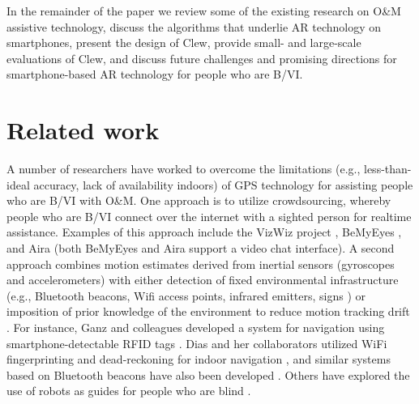 \documentclass[chi_draft]{sigchi}
\newcommand{\BVI}{B/VI\xspace}
\newcommand{\OM}{O\&M\xspace}
\begin{document}
In the remainder of the paper we review some of the existing research on \OM assistive technology, discuss the algorithms that underlie AR technology on smartphones, present the design of Clew, provide small- and large-scale evaluations of Clew, and discuss future challenges and promising directions for smartphone-based AR technology for people who are \BVI.

\section{Related work}


A number of researchers have worked to overcome the limitations (e.g., less-than-ideal accuracy, lack of availability indoors) of GPS technology for assisting people who are \BVI with \OM.  One approach is to utilize crowdsourcing, whereby people who are \BVI connect over the internet with a sighted person for realtime assistance.  Examples of this approach include the VizWiz project \cite{bigham2010vizwiz}, BeMyEyes \cite{bemyeyesaccessworld}, and Aira \cite{aira} (both BeMyEyes and Aira support a video chat interface).  A second approach combines motion estimates derived from inertial sensors (gyroscopes and accelerometers) with either detection of fixed environmental infrastructure (e.g., Bluetooth beacons, Wifi access points, infrared emitters, signs \cite{legge2013indoor}) or imposition of prior knowledge of the environment to reduce motion tracking drift \cite{riehle2013indoor}.  For instance, Ganz and colleagues developed a system for navigation using smartphone-detectable RFID tags \cite{ganz2015percept, ganz2011percept, ganz2014percept}.  Dias and her collaborators utilized WiFi fingerprinting and dead-reckoning for indoor navigation \cite{Dias__2014_7778}, and similar systems based on Bluetooth beacons have also been developed \cite{ishihara2017beacon, ahmetovic2016navcog}.  Others have explored the use of robots as guides for people who are blind \cite{Nanavati:2018:CIN:3173386.3176976}.%
\end{document}
